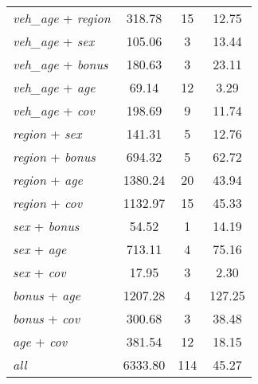 {\begin{ThreePartTable}
\begin{longtable}{lccc}
    \textit{veh\_age} + \textit{region} &   318.78 &       15 &    12.75 \\
    \textit{veh\_age} + \textit{sex} &   105.06 &        3 &    13.44 \\
    \textit{veh\_age} + \textit{bonus} &   180.63 &        3 &    23.11 \\
    \textit{veh\_age} + \textit{age} &    69.14 &       12 &     3.29 \\
    \textit{veh\_age} + \textit{cov} &   198.69 &        9 &    11.74 \\
    \textit{region} + \textit{sex} &   141.31 &        5 &    12.76 \\
    \textit{region} + \textit{bonus} &   694.32 &        5 &    62.72 \\
    \textit{region} + \textit{age} &  1380.24 &       20 &    43.94 \\
    \textit{region} + \textit{cov} &  1132.97 &       15 &    45.33 \\
    \textit{sex} + \textit{bonus} &    54.52 &        1 &    14.19 \\
    \textit{sex} + \textit{age} &   713.11 &        4 &    75.16 \\
    \textit{sex} + \textit{cov} &    17.95 &        3 &     2.30 \\
    \textit{bonus} + \textit{age} &  1207.28 &        4 &   127.25 \\
    \textit{bonus} + \textit{cov} &   300.68 &        3 &    38.48 \\
    \textit{age} + \textit{cov} &   381.54 &       12 &    18.15 \\
    \textit{all}\tnote{\ddag} &  6333.80 &      114 &    45.27 \\

\end{longtable}
\end{ThreePartTable}
}
